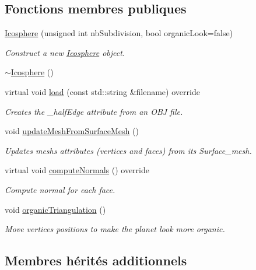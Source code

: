 \subsection*{Fonctions membres publiques}
\begin{DoxyCompactItemize}
\item 
\hyperlink{class_icosphere_a6051bb79f73f5aecb95074118fb019b3}{Icosphere} (unsigned int nb\+Subdivision, bool organic\+Look=false)
\begin{DoxyCompactList}\small\item\em Construct a new \hyperlink{class_icosphere}{Icosphere} object. \end{DoxyCompactList}\item 
\hyperlink{class_icosphere_ac9473c8c8d6085b6370d95772b898a45}{$\sim$\+Icosphere} ()
\item 
virtual void \hyperlink{class_icosphere_a72c3cc3d95cf508a623fe336cbbab350}{load} (const std\+::string \&filename) override
\begin{DoxyCompactList}\small\item\em Creates the \+\_\+half\+Edge attribute from an O\+BJ file. \end{DoxyCompactList}\item 
void \hyperlink{class_icosphere_a38645b095ea6895c2aa5bbff7d8edf20}{update\+Mesh\+From\+Surface\+Mesh} ()
\begin{DoxyCompactList}\small\item\em Updates mesh\textquotesingle{}s attributes (vertices and faces) from its Surface\+\_\+mesh. \end{DoxyCompactList}\item 
virtual void \hyperlink{class_icosphere_af7d6c8c60248794f6a6c382dc5f98a24}{compute\+Normals} () override
\begin{DoxyCompactList}\small\item\em Compute normal for each face. \end{DoxyCompactList}\item 
void \hyperlink{class_icosphere_ab3470de718fee359ef4691e0c2ee987a}{organic\+Triangulation} ()
\begin{DoxyCompactList}\small\item\em Move vertices positions to make the planet look more organic. \end{DoxyCompactList}\end{DoxyCompactItemize}
\subsection*{Membres hérités additionnels}


